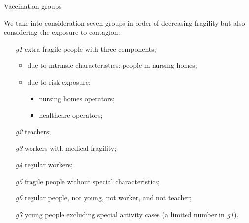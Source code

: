 \documentclass[8pt]{beamer}
\begin{document}
\begin{frame}{Vaccination groups}

We take into consideration seven groups in order of decreasing fragility but also considering the exposure to contagion:

\begin{enumerate}
\item [\emph{g1}]
	extra fragile people with three components;
	\begin{itemize}
		\item due to intrinsic characteristics: people in nursing homes;
		\item due to risk exposure:
		\begin{itemize}
			\item nursing homes operators;
			\item healthcare operators;
 		\end{itemize} 
 	\end{itemize}  
\item [\emph{g2}]
	teachers;
\item [\emph{g3}]
	workers with medical fragility;
\item [\emph{g4}]
	regular workers;
\item [\emph{g5}]
	fragile people without special characteristics;
\item [\emph{g6}]
	regular people, not young, not worker, and not teacher;
\item [\emph{g7}]
	young people excluding special activity cases (a limited number in \emph{g1}).
\end{enumerate}

\end{frame}
\end{document}
